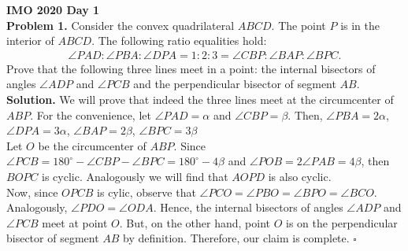    \textbf{IMO 2020 Day 1}\\
   
   \textbf{Problem 1. }Consider the convex quadrilateral $ABCD$. The point $P$ is in the interior of $ABCD$. The following ratio equalities hold:
		\begin{align*}
			\angle PAD : \angle PBA : \angle DPA = 1:2:3 = \angle CBP : \angle BAP :\angle BPC.
		\end{align*}
	Prove that the following three lines meet in a point: the internal bisectors of angles $\angle ADP$ and $\angle PCB$ and the perpendicular bisector of segment $AB$.\\
	
	\textbf{Solution.} We will prove that indeed the three lines meet at the circumcenter of $ABP$.
	For the convenience, let $\angle PAD = \alpha$ and $\angle CBP = \beta$.  Then, $\angle PBA= 2\alpha$,  $\angle DPA = 3\alpha$,  $\angle BAP = 2\beta$,  $\angle BPC = 3\beta$ \\
	
	Let  $O$ be the circumcenter of $ABP$. Since $\angle PCB = 180^\circ - \angle CBP - \angle BPC = 180^\circ - 4\beta$  and  $\angle POB = 2\angle PAB = 4\beta$,  then $BOPC$ is cyclic. Analogously we will find that $AOPD$ is also cyclic. \\
	
	Now, since $OPCB$ is cylic, observe that $\angle PCO = \angle PBO = \angle BPO = \angle BCO$. Analogously, $\angle PDO = \angle ODA$. Hence, the internal bisectors of angles $\angle ADP$ and $\angle PCB$ meet at point $O$. But, on the other hand, point $O$ is on the perpendicular bisector of segment $AB$ by definition. Therefore, our claim is complete. $\square$
	
